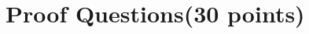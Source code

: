 \documentclass[11pt]{exam}
\begin{document}
\begin{enumerate}[a)]
\begin{solution}
    \\ \hspace*{\fill} \\
    \\ \hspace*{\fill} \\
    \\ \hspace*{\fill} \\
    \\ \hspace*{\fill} \\
    \end{solution}
\end{enumerate}

\newpage
\section{Proof Questions(30 points)}
\end{document}
